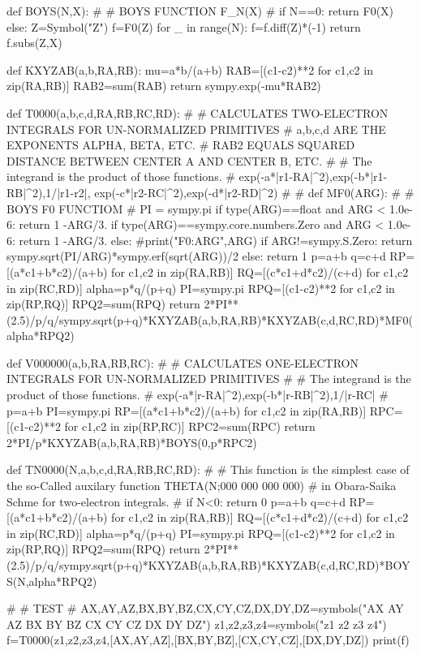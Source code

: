     
def BOYS(N,X):
#
#  BOYS FUNCTION F_N(X)
#
    if N==0:
        return F0(X)
    else:
        Z=Symbol("Z")
        f=F0(Z)
        for _ in range(N):
            f=f.diff(Z)*(-1)
        return f.subs(Z,X)
    
def KXYZAB(a,b,RA,RB):
    mu=a*b/(a+b)
    RAB=[(c1-c2)**2 for c1,c2 in zip(RA,RB)]
    RAB2=sum(RAB)
    return sympy.exp(-mu*RAB2)

def T0000(a,b,c,d,RA,RB,RC,RD):
#
# CALCULATES TWO-ELECTRON INTEGRALS FOR UN-NORMALIZED PRIMITIVES
# a,b,c,d ARE THE EXPONENTS ALPHA, BETA, ETC.
# RAB2 EQUALS SQUARED DISTANCE BETWEEN CENTER A AND CENTER B, ETC.
#
# The integrand is the product of those functions.
#   exp(-a*|r1-RA|^2),exp(-b*|r1-RB|^2),1/|r1-r2|, exp(-c*|r2-RC|^2),exp(-d*|r2-RD|^2)
#
#
    def MF0(ARG):
    #
    # BOYS F0 FUNCTIOM
    #
        PI = sympy.pi
        if  type(ARG)==float and ARG < 1.0e-6:
            return 1 -ARG/3.
        if  type(ARG)==sympy.core.numbers.Zero and ARG < 1.0e-6:
            return 1 -ARG/3.
        else:
            #print("F0:ARG",ARG)
            if ARG!=sympy.S.Zero:
                return sympy.sqrt(PI/ARG)*sympy.erf(sqrt(ARG))/2
            else:
                return 1
    p=a+b
    q=c+d
    RP=[(a*c1+b*c2)/(a+b) for c1,c2 in zip(RA,RB)]
    RQ=[(c*c1+d*c2)/(c+d) for c1,c2 in zip(RC,RD)]
    alpha=p*q/(p+q)
    PI=sympy.pi
    RPQ=[(c1-c2)**2 for c1,c2 in zip(RP,RQ)]
    RPQ2=sum(RPQ)
    return 2*PI**(2.5)/p/q/sympy.sqrt(p+q)*KXYZAB(a,b,RA,RB)*KXYZAB(c,d,RC,RD)*MF0(alpha*RPQ2)

def V000000(a,b,RA,RB,RC):
#
# CALCULATES ONE-ELECTRON INTEGRALS FOR UN-NORMALIZED PRIMITIVES
#
#  The integrand is the product of those functions.
#   exp(-a*|r-RA|^2),exp(-b*|r-RB|^2),1/|r-RC|
#  
    p=a+b
    PI=sympy.pi
    RP=[(a*c1+b*c2)/(a+b) for c1,c2 in zip(RA,RB)]
    RPC=[(c1-c2)**2 for c1,c2 in zip(RP,RC)]
    RPC2=sum(RPC)
    return 2*PI/p*KXYZAB(a,b,RA,RB)*BOYS(0,p*RPC2)

def TN0000(N,a,b,c,d,RA,RB,RC,RD):
#
#  This function is the simplest case of the so-Called auxilary function THETA(N;000 000 000 000)
#  in Obara-Saika Schme for two-electron integrals.
#
    if N<0:
        return 0
    p=a+b
    q=c+d
    RP=[(a*c1+b*c2)/(a+b) for c1,c2 in zip(RA,RB)]
    RQ=[(c*c1+d*c2)/(c+d) for c1,c2 in zip(RC,RD)]
    alpha=p*q/(p+q)
    PI=sympy.pi
    RPQ=[(c1-c2)**2 for c1,c2 in zip(RP,RQ)]
    RPQ2=sum(RPQ)
    return 2*PI**(2.5)/p/q/sympy.sqrt(p+q)*KXYZAB(a,b,RA,RB)*KXYZAB(c,d,RC,RD)*BOYS(N,alpha*RPQ2)


#
#  TEST
#
AX,AY,AZ,BX,BY,BZ,CX,CY,CZ,DX,DY,DZ=symbols("AX AY AZ BX BY BZ CX CY CZ DX DY DZ")
z1,z2,z3,z4=symbols("z1 z2 z3 z4")
f=T0000(z1,z2,z3,z4,[AX,AY,AZ],[BX,BY,BZ],[CX,CY,CZ],[DX,DY,DZ])
print(f)


